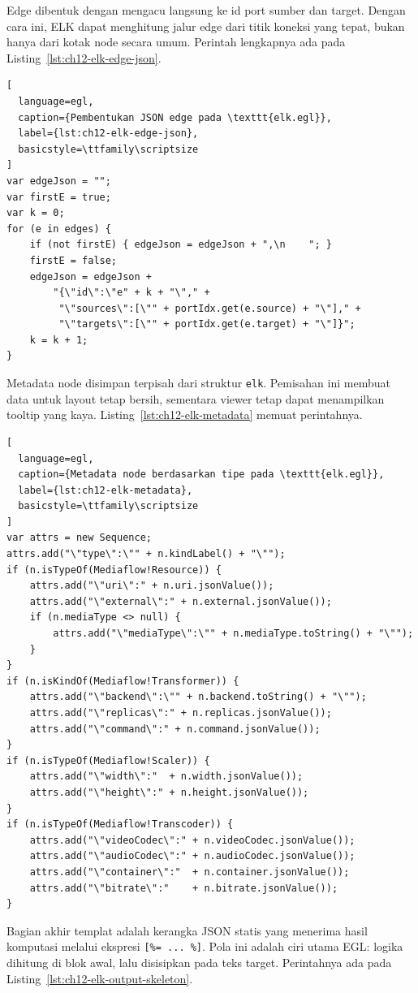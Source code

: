 Edge dibentuk dengan mengacu langsung ke id port sumber dan target. Dengan cara ini, ELK dapat menghitung jalur edge dari titik koneksi yang tepat, bukan hanya dari kotak node secara umum. Perintah lengkapnya ada pada Listing~\ref{lst:ch12-elk-edge-json}.

\begin{lstlisting}[
  language=egl,
  caption={Pembentukan JSON edge pada \texttt{elk.egl}},
  label={lst:ch12-elk-edge-json},
  basicstyle=\ttfamily\scriptsize
]
var edgeJson = "";
var firstE = true;
var k = 0;
for (e in edges) {
    if (not firstE) { edgeJson = edgeJson + ",\n    "; }
    firstE = false;
    edgeJson = edgeJson +
        "{\"id\":\"e" + k + "\"," +
         "\"sources\":[\"" + portIdx.get(e.source) + "\"]," +
         "\"targets\":[\"" + portIdx.get(e.target) + "\"]}";
    k = k + 1;
}
\end{lstlisting}

Metadata node disimpan terpisah dari struktur \texttt{elk}. Pemisahan ini membuat data untuk layout tetap bersih, sementara viewer tetap dapat menampilkan tooltip yang kaya. Listing~\ref{lst:ch12-elk-metadata} memuat perintahnya.

\begin{lstlisting}[
  language=egl,
  caption={Metadata node berdasarkan tipe pada \texttt{elk.egl}},
  label={lst:ch12-elk-metadata},
  basicstyle=\ttfamily\scriptsize
]
var attrs = new Sequence;
attrs.add("\"type\":\"" + n.kindLabel() + "\"");
if (n.isTypeOf(Mediaflow!Resource)) {
    attrs.add("\"uri\":" + n.uri.jsonValue());
    attrs.add("\"external\":" + n.external.jsonValue());
    if (n.mediaType <> null) {
        attrs.add("\"mediaType\":\"" + n.mediaType.toString() + "\"");
    }
}
if (n.isKindOf(Mediaflow!Transformer)) {
    attrs.add("\"backend\":\"" + n.backend.toString() + "\"");
    attrs.add("\"replicas\":" + n.replicas.jsonValue());
    attrs.add("\"command\":" + n.command.jsonValue());
}
if (n.isTypeOf(Mediaflow!Scaler)) {
    attrs.add("\"width\":"  + n.width.jsonValue());
    attrs.add("\"height\":" + n.height.jsonValue());
}
if (n.isTypeOf(Mediaflow!Transcoder)) {
    attrs.add("\"videoCodec\":" + n.videoCodec.jsonValue());
    attrs.add("\"audioCodec\":" + n.audioCodec.jsonValue());
    attrs.add("\"container\":"  + n.container.jsonValue());
    attrs.add("\"bitrate\":"    + n.bitrate.jsonValue());
}
\end{lstlisting}

Bagian akhir templat adalah kerangka JSON statis yang menerima hasil komputasi melalui ekspresi \texttt{[\%= ... \%]}. Pola ini adalah ciri utama EGL: logika dihitung di blok awal, lalu disisipkan pada teks target. Perintahnya ada pada Listing~\ref{lst:ch12-elk-output-skeleton}.

